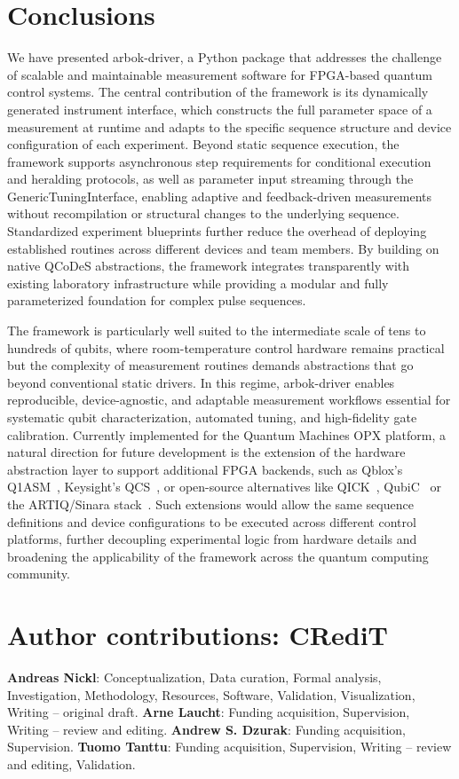 \documentclass[numbers, preprint, twocolumn,10pt]{elsarticle}
\begin{document}
\section{Conclusions}
\noindent
We have presented arbok-driver, a Python package that addresses the challenge of scalable and maintainable measurement software for FPGA-based quantum control systems. The central contribution of the framework is its dynamically generated instrument interface, which constructs the full parameter space of a measurement at runtime and adapts to the specific sequence structure and device configuration of each experiment. Beyond static sequence execution, the framework supports asynchronous step requirements for conditional execution and heralding protocols, as well as parameter input streaming through the GenericTuningInterface, enabling adaptive and feedback-driven measurements without recompilation or structural changes to the underlying sequence. Standardized experiment blueprints further reduce the overhead of deploying established routines across different devices and team members. By building on native QCoDeS abstractions, the framework integrates transparently with existing laboratory infrastructure while providing a modular and fully parameterized foundation for complex pulse sequences.

The framework is particularly well suited to the intermediate scale of tens to hundreds of qubits, where room-temperature control hardware remains practical but the complexity of measurement routines demands abstractions that go beyond conventional static drivers. In this regime, arbok-driver enables reproducible, device-agnostic, and adaptable measurement workflows essential for systematic qubit characterization, automated tuning, and high-fidelity gate calibration. Currently implemented for the Quantum Machines OPX platform, a natural direction for future development is the extension of the hardware abstraction layer to support additional FPGA backends, such as Qblox's Q1ASM~\cite{qblox_q1asm}, Keysight's QCS~\cite{keysight_qcs}, or open-source alternatives like  QICK~\cite{stefanazzi_qick_2022}, QubiC~\cite{xu_qubic_2021} or the ARTIQ/Sinara stack~\cite{kasprowicz_artiq_2020}. Such extensions would allow the same sequence definitions and device configurations to be executed across different control platforms, further decoupling experimental logic from hardware details and broadening the applicability of the framework across the quantum computing community. %

\section*{Author contributions: CRediT}
\noindent
\textbf{Andreas Nickl}: Conceptualization, Data curation, Formal analysis, Investigation, Methodology, Resources, Software, Validation, Visualization, Writing – original draft.
\textbf{Arne Laucht}: Funding acquisition, Supervision, Writing – review and editing.
\textbf{Andrew S. Dzurak}: Funding acquisition, Supervision.
\textbf{Tuomo Tanttu}: Funding acquisition, Supervision, Writing – review and editing, Validation.
\end{document}
